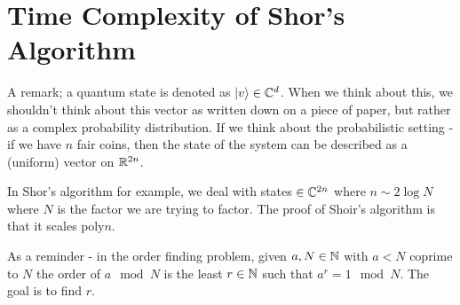 \section{Time Complexity of Shor's Algorithm}

A remark; a quantum state is denoted as $\lvert v \rangle \in \mathbb{C}^d$. When we think about this, we shouldn't think about this vector as written down on a piece of paper, but rather as a complex probability distribution. If we think about the probabilistic setting - if we have $n$ fair coins, then the state of the system can be described as a (uniform) vector on $\mathbb{R}^{2n}$.

In Shor's algorithm for example, we deal with states $\in \mathbb{C}^{2n}$ where $n \sim 2\log N$ where $N$ is the factor we are trying to factor. The proof of Shoir's algorithm is that it scales $\text{poly} n$. 

As a reminder - in the order finding problem, given $a, N \in \mathbb{N}$ with $a < N$ coprime to $N$ the order of $a \mod N$ is the least $r \in \mathbb{N}$ such that $a^r = 1 \mod N$. The goal is to find $r$.

